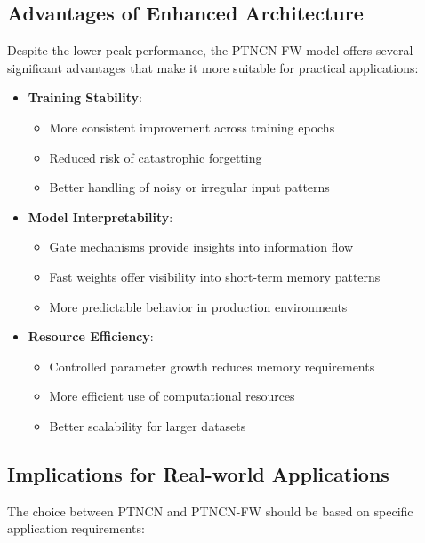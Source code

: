 \documentclass{article}
\begin{document}
\subsection{Advantages of Enhanced Architecture}

Despite the lower peak performance, the PTNCN-FW model offers several significant advantages that make it more suitable for practical applications:

\begin{itemize}
    \item \textbf{Training Stability}:
    \begin{itemize}
        \item More consistent improvement across training epochs
        \item Reduced risk of catastrophic forgetting
        \item Better handling of noisy or irregular input patterns
    \end{itemize}

    \item \textbf{Model Interpretability}:
    \begin{itemize}
        \item Gate mechanisms provide insights into information flow
        \item Fast weights offer visibility into short-term memory patterns
        \item More predictable behavior in production environments
    \end{itemize}

    \item \textbf{Resource Efficiency}:
    \begin{itemize}
        \item Controlled parameter growth reduces memory requirements
        \item More efficient use of computational resources
        \item Better scalability for larger datasets
    \end{itemize}
\end{itemize}

\subsection{Implications for Real-world Applications}

The choice between PTNCN and PTNCN-FW should be based on specific application requirements:
\end{document}
